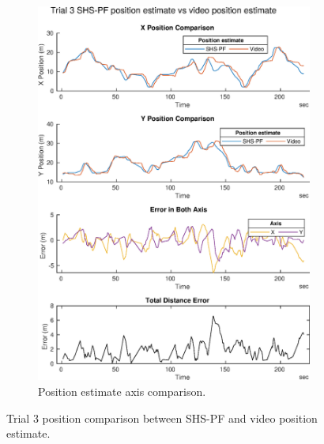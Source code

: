 \begin{figure}[H]
\begin{subfigure}[t]{.45\textwidth}
 		\includegraphics[width=\linewidth]{images/20201129_1900_trial_3_traj_1}
 		\caption{Position estimate axis comparison.}
 		\label{fig:shspf_trial3_comparison}
 	\end{subfigure}
 	\caption{Trial 3 position comparison between SHS-PF and video position estimate.}
 	\label{fig:shspf_trial3_shs_gt_comparison}
 \end{figure}
